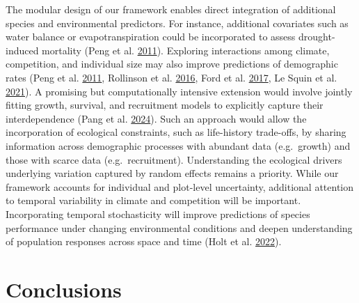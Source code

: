 \documentclass[12pt]{article}
\begin{document}
The modular design of our framework enables direct integration of
additional species and environmental predictors. For instance,
additional covariates such as water balance or evapotranspiration could
be incorporated to assess drought-induced mortality (Peng et al.
\protect\hyperlink{ref-Peng2011}{2011}). Exploring interactions among
climate, competition, and individual size may also improve predictions
of demographic rates (Peng et al.
\protect\hyperlink{ref-Peng2011}{2011}, Rollinson et al.
\protect\hyperlink{ref-Rollinson2016}{2016}, Ford et al.
\protect\hyperlink{ref-Ford2017}{2017}, Le Squin et al.
\protect\hyperlink{ref-LeSquin2021}{2021}). A promising but
computationally intensive extension would involve jointly fitting
growth, survival, and recruitment models to explicitly capture their
interdependence (Pang et al.
\protect\hyperlink{ref-pang2024niche}{2024}). Such an approach would
allow the incorporation of ecological constraints, such as life-history
trade-offs, by sharing information across demographic processes with
abundant data (e.g.~growth) and those with scarce data
(e.g.~recruitment). Understanding the ecological drivers underlying
variation captured by random effects remains a priority. While our
framework accounts for individual and plot-level uncertainty, additional
attention to temporal variability in climate and competition will be
important. Incorporating temporal stochasticity will improve predictions
of species performance under changing environmental conditions and
deepen understanding of population responses across space and time (Holt
et al. \protect\hyperlink{ref-Holt2022}{2022}).

\hypertarget{conclusions}{%
\section{Conclusions}\label{conclusions}}
\end{document}
